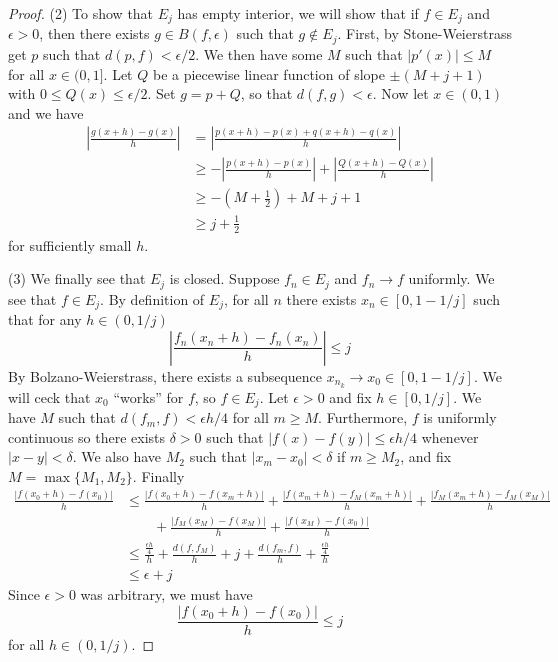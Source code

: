 \documentclass[12pt, a4paper]{book}
\theoremstyle{nonumberplain}
\newtheorem{proof}{Proof}
\begin{document}
\begin{proof}
    (2) To show that $E_j$ has empty interior, we will show that if $f\in E_j$ and $\epsilon>0$, then there exists $g\in B(f,\epsilon)$ such that $g\notin E_j$.
    First, by Stone-Weierstrass get $p$ such that $d(p,f)<\epsilon/2$.
    We then have some $M$ such that $|p'(x)|\leq M$ for all $x\in(0,1]$.
    Let $Q$ be a piecewise linear function of slope $\pm(M+j+1)$ with $0\leq Q(x)\leq\epsilon/2$.
    Set $g=p+Q$, so that $d(f,g)<\epsilon$.
    Now let $x\in(0,1)$ and we have
    \begin{align*}
        \left\lvert\frac{g(x+h)-g(x)}{h}\right\rvert &= \left\lvert\frac{p(x+h)-p(x)+q(x+h)-q(x)}{h}\right\rvert\\
                                                     &\geq -\left\lvert\frac{p(x+h)-p(x)}{h}\right\rvert+\left\lvert\frac{Q(x+h)-Q(x)}{h}\right\rvert\\
                                                     &\geq -\left(M+\frac{1}{2}\right)+M+j+1\\
                                                     &\geq j+\frac{1}{2}
    \end{align*}
    for sufficiently small $h$.

    (3) We finally see that $E_j$ is closed.
    Suppose $f_n\in E_j$ and $f_n\to f$ uniformly.
    We see that $f\in E_j$.
    By definition of $E_j$, for all $n$ there exists $x_n\in[0,1-1/j]$ such that for any $h\in(0,1/j)$
    \[\left\lvert\frac{f_n(x_n+h)-f_n(x_n)}{h}\right\rvert\leq j\]
    By Bolzano-Weierstrass, there exists a subsequence $x_{n_k}\to x_0\in[0,1-1/j]$.
    We will ceck that $x_0$ ``works'' for $f$, so $f\in E_j$.
    Let $\epsilon>0$ and fix $h\in[0,1/j]$.
    We have $M$ such that $d(f_m,f)<\epsilon h/4$ for all $m\geq M$.
    Furthermore, $f$ is uniformly continuous so there exists $\delta>0$ such that $|f(x)-f(y)|\leq\epsilon h/4$ whenever $|x-y|<\delta$.
    We also have $M_2$ such that $|x_m-x_0|<\delta$ if $m\geq M_2$, and fix $M=\max\{M_1,M_2\}$.
    Finally
    \begin{align*}
        \frac{|f(x_0+h)-f(x_0)|}{h} &\leq \frac{|f(x_0+h)-f(x_m+h)|}{h}+\frac{|f(x_m+h)-f_M(x_m+h)|}{h}+\frac{|f_M(x_m+h)-f_M(x_M)|}{h}\\
                                    &\qquad+\frac{|f_M(x_M)-f(x_M)|}{h}+\frac{|f(x_M)-f(x_0)|}{h}\\
                                    &\leq \frac{\frac{\epsilon h}{4}}{h}+\frac{d(f,f_M)}{h}+j+\frac{d(f_m,f)}{h}+\frac{\frac{\epsilon h}{4}}{h}\\
                                    &\leq \epsilon+j
    \end{align*}
    Since $\epsilon>0$ was arbitrary, we must have
    \[\frac{|f(x_0+h)-f(x_0)|}{h}\leq j\]
    for all $h\in(0,1/j)$.
\end{proof}
\end{document}

